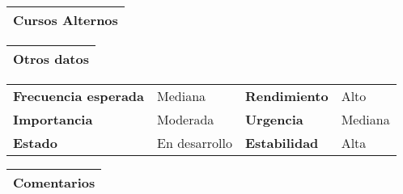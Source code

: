 \documentclass[11pt,a4paper]{article}
\begin{document}
\begin{table}[H]
	\begin{tabularx}{\textwidth}{X}
		\textbf{Cursos Alternos}\\ \hline
	\end{tabularx}
	
\end{table}

\begin{table}[H]
	\begin{tabularx}{\textwidth}{X}
		\textbf{Otros datos}\\ \hline
	\end{tabularx}

	\begin{tabularx}{\textwidth}{lXlX}
		\textbf{Frecuencia esperada} & Mediana & \textbf{Rendimiento} & Alto\\
		\textbf{Importancia} & Moderada & \textbf{Urgencia} & Mediana \\
		\textbf{Estado} & En desarrollo & \textbf{Estabilidad} & Alta\\
	\end{tabularx}
	
	\begin{tabularx}{\textwidth}{X}
		\textbf{Comentarios}\\ \hline
	\end{tabularx}
\end{table}

\newpage


\end{document}
